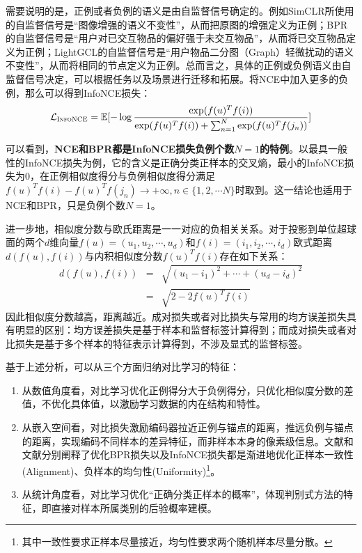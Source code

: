 需要说明的是，正例或者负例的语义是由自监督信号确定的。例如SimCLR\cite{Chen:2020:ICML}所使用的自监督信号是“图像增强的语义不变性”，从而把原图的增强定义为正例；BPR\cite{Steffen:2009:UAI}的自监督信号是“用户对已交互物品的偏好强于未交互物品”，从而将已交互物品定义为正例；LightGCL\cite{lightgcl:2023:ICLR}的自监督信号是“用户物品二分图（Graph）轻微扰动的语义不变性”，从而将相同的节点定义为正例。总而言之，具体的正例或负例语义由自监督信号决定，可以根据任务以及场景进行迁移和拓展。将NCE中加入更多的负例，那么可以得到InfoNCE损失\cite{Oord:2018:arxiv}：
\begin{eqnarray}
	\mathcal{L}_\textsc{InfoNCE} = \mathbb E[-\log \frac{\exp(f(u)^Tf(i))}{\exp(f(u)^Tf(i))+\sum_{n=1}^{N}\exp(f(u)^Tf(j_n))}]
\end{eqnarray}

可以看到，\textbf{NCE和BPR都是InfoNCE损失负例个数$N=1$的特例}。以最具一般性的InfoNCE损失为例，它的含义是正确分类正样本的交叉熵\cite{Oord:2018:arxiv}，最小的InfoNCE损失为0，在正例相似度得分与负例相似度得分满足$f(u)^Tf(i)- f(u)^Tf(j_n)\rightarrow +\infty, n \in \{1,2,\cdots N\}$时取到。这一结论也适用于NCE和BPR，只是负例个数$N=1$。

进一步地，相似度分数与欧氏距离是一一对应的负相关关系。对于投影到单位超球面的两个$d$维向量$f(u) = (u_1,u_2,\cdots,u_d)$和$f(i) = (i_1,i_2,\cdots,i_d)$欧式距离$d(f(u),f(i))$与内积相似度分数$f(u)^Tf(i)$存在如下关系：
\begin{eqnarray}
d(f(u),f(i)) &=& \sqrt{(u_1-i_1)^2+\cdots +(u_d-i_d)^2} \nonumber \\
&=&\sqrt{2-2f(u)^Tf(i)} \nonumber
\end{eqnarray}
因此相似度分数越高，距离越近。成对损失或者对比损失与常用的均方误差损失具有明显的区别：均方误差损失是基于样本和监督标签计算得到；而成对损失或者对比损失是基于多个样本的特征表示计算得到，不涉及显式的监督标签。

基于上述分析，可以从三个方面归纳对比学习的特征：
\begin{enumerate}
\item 从数值角度看，对比学习优化正例得分大于负例得分，只优化相似度分数的差值，不优化具体值，以激励学习数据的内在结构和特性。
\item 从嵌入空间看，对比损失激励编码器拉近正例与锚点的距离，推远负例与锚点的距离，实现编码不同样本的差异特征，而非样本本身的像素级信息。文献\cite{Wang:2022:KDD}和文献\cite{Wang:2020:ICML}分别阐释了优化BPR损失以及InfoNCE损失都是渐进地优化正样本一致性(Alignment)、负样本的均匀性(Uniformity)\footnote{其中一致性要求正样本尽量接近，均匀性要求两个随机样本尽量分散。}。
\item 从统计角度看，对比学习优化“正确分类正样本的概率”\cite{Oord:2018:arxiv}，体现判别式方法的特征，即直接对样本所属类别的后验概率建模。
\end{enumerate}

